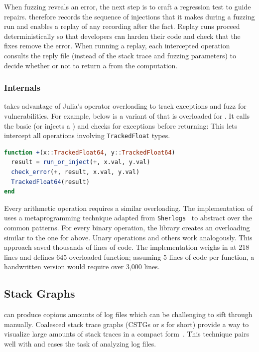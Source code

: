 \documentclass{juliacon}
\begin{document}
When fuzzing reveals an error, the next step is to craft a regression test to
guide repairs.
\TF{} therefore records the sequence of injections that it makes during a fuzzing
run and enables a replay of any recording after the fact.
Replay runs proceed deterministically so that developers can harden
their code and check that the fixes remove the error.
When running a replay, each intercepted operation consults the reply
file (instead of the stack trace and fuzzing parameters) to decide
whether or not to return a \Nan{} from the computation.


\subsubsection{Internals}

\TF{} takes advantage of Julia's operator overloading to track exceptions and
fuzz for vulnerabilities.
For example, below is a variant of \code{+} that is overloaded
for .
It calls the basic \code{+} (or injects a \Nan{}) and checks for exceptions
before returning:
This lets \TF{} intercept all \fp{} operations involving \texttt{TrackedFloat} types.

\begin{lstlisting}[language = Julia]
function +(x::TrackedFloat64, y::TrackedFloat64)
  result = run_or_inject(+, x.val, y.val)
  check_error(+, result, x.val, y.val)
  TrackedFloat64(result)
end
\end{lstlisting}

Every arithmetic operation requires a similar overloading.
The implementation of \TF{} uses a metaprogramming technique
adapted from \texttt{Sherlogs}~\cite{kMilanklSherlogsJl2021}
to abstract over the common patterns.
For every binary operation, the library creates an overloading similar
to the one for \code{+} above.
Unary operations and others work analogously.
This approach saved thousands of lines of code.
The implementation weighs in at 218 lines and defines 645 overloaded function;
assuming 5 lines of code per function, a handwritten version would require over 3,000 lines.


\subsection{Stack Graphs}
\label{s:cstg}

\TF{} can produce copious amounts of log files which can be challenging to sift through manually.
Coalesced stack trace graphs (CSTGs or \CSTG{}s for short) provide a way to visualize large amounts of stack traces in a compact form~\cite{humphreySystematicDebuggingMethods2014}.
This technique pairs well with \TF{} and eases the task of analyzing log files.
\end{document}

